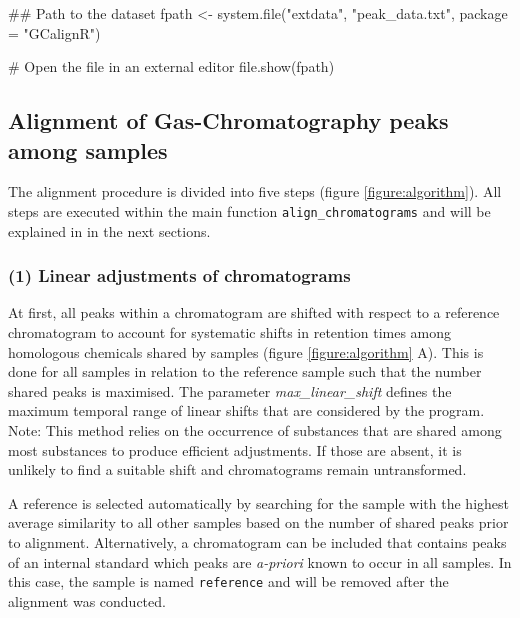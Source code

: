 \begin{Schunk}
\begin{Sinput}
## Path to the dataset
fpath <- system.file("extdata", "peak_data.txt", package = "GCalignR")
\end{Sinput}
\end{Schunk}

\begin{Schunk}
\begin{Sinput}
# Open the file in an external editor
file.show(fpath)
\end{Sinput}
\end{Schunk}

\subsection{Alignment of Gas-Chromatography peaks among
samples}\label{alignment-of-gas-chromatography-peaks-among-samples}

The alignment procedure is divided into five steps (figure
\ref{figure:algorithm}). All steps are executed within the main function
\texttt{align\_chromatograms} and will be explained in in the next
sections.

\subsubsection{(1) Linear adjustments of
chromatograms}\label{linear-adjustments-of-chromatograms}

At first, all peaks within a chromatogram are shifted with respect to a
reference chromatogram to account for systematic shifts in retention
times among homologous chemicals shared by samples (figure
\ref{figure:algorithm} A). This is done for all samples in relation to
the reference sample such that the number shared peaks is maximised. The
parameter \emph{max\_linear\_shift} defines the maximum temporal range
of linear shifts that are considered by the program. \newline
Note: This method relies on the occurrence of substances that are shared
among most substances to produce efficient adjustments. If those are
absent, it is unlikely to find a suitable shift and chromatograms remain
untransformed. \par
A reference is selected automatically by searching for the sample with
the highest average similarity to all other samples based on the number
of shared peaks prior to alignment. Alternatively, a chromatogram can be
included that contains peaks of an internal standard which peaks are
\emph{a-priori} known to occur in all samples. In this case, the sample
is named \texttt{reference} and will be removed after the alignment was
conducted.

